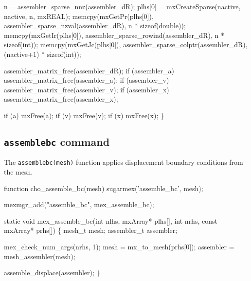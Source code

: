     n = assembler_sparse_nnz(assembler_dR);
    plhs[0] = mxCreateSparse(nactive, nactive, n, mxREAL);
    memcpy(mxGetPr(plhs[0]), assembler_sparse_nzval(assembler_dR), 
           n * sizeof(double));
    memcpy(mxGetIr(plhs[0]), assembler_sparse_rowind(assembler_dR), 
           n * sizeof(int));
    memcpy(mxGetJc(plhs[0]), assembler_sparse_colptr(assembler_dR), 
           (nactive+1) * sizeof(int));

    assembler_matrix_free(assembler_dR);
    if (assembler_a) assembler_matrix_free(assembler_a);
    if (assembler_v) assembler_matrix_free(assembler_v);
    if (assembler_x) assembler_matrix_free(assembler_x);

    if (a) mxFree(a);
    if (v) mxFree(v);
    if (x) mxFree(x);
\}

\nwendcode{}\nwdocspar


\subsection{{\tt{}assemble{}bc} command}

The {\tt{}assemble{}bc(mesh)} function applies displacement boundary
conditions from the mesh.

\nwenddocs{}\endmoddef
function cho_assemble_bc(mesh)
sugarmex('assemble_bc', mesh);
\nwendcode{}\nwdocspar

\nwenddocs{}\plusendmoddef
mexmgr_add("assemble_bc", mex_assemble_bc);
\nwendcode{}\nwdocspar

\nwenddocs{}\plusendmoddef
static void mex_assemble_bc(int nlhs, mxArray* plhs[],
                            int nrhs, const mxArray* prhs[])
\{
    mesh_t      mesh;
    assembler_t assembler;

    mex_check_num_args(nrhs, 1);
    mesh      = mx_to_mesh(prhs[0]);
    assembler = mesh_assembler(mesh);

    assemble_displace(assembler);
\}

\nwendcode{}\nwdocspar


